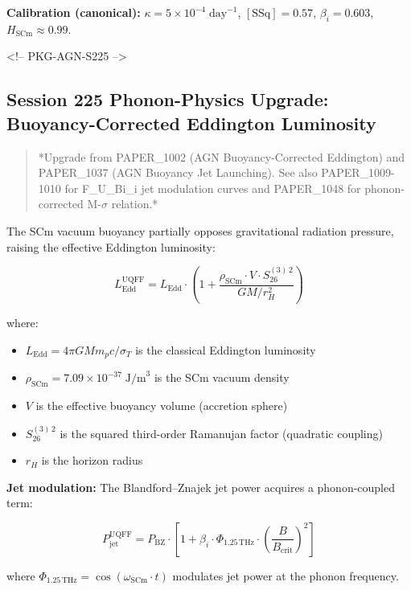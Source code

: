 \documentclass[12pt,a4paper]{article}
\begin{document}
\textbf{Calibration (canonical):} $\kappa = 5 \times 10^{-4}\;\text{day}^{-1}$, $[\text{SSq}] = 0.57$, $\beta_i = 0.603$, $H_{\text{SCm}} \approx 0.99$.

<!-- PKG-AGN-S225 -->

\subsection{Session 225 Phonon-Physics Upgrade: Buoyancy-Corrected Eddington Luminosity}

\begin{quote}
*Upgrade from PAPER\_1002 (AGN Buoyancy-Corrected Eddington) and PAPER\_1037
(AGN Buoyancy Jet Launching).  See also PAPER\_1009-1010 for F\_{U\_Bi\_i} jet
modulation curves and PAPER\_1048 for phonon-corrected M-$\sigma$ relation.*
\end{quote}

The SCm vacuum buoyancy partially opposes gravitational radiation pressure, raising the effective Eddington luminosity:

\begin{equation}
L_{\text{Edd}}^{\text{UQFF}} = L_{\text{Edd}} \cdot \left(1 + \frac{\rho_{\text{SCm}} \cdot V \cdot S_{26}^{(3)\,2}}{G M / r_H^2}\right)
\end{equation}

where:

\begin{itemize}
  \item $L_{\text{Edd}} = 4\pi G M m_p c / \sigma_T$ is the classical Eddington luminosity
  \item $\rho_{\text{SCm}} = 7.09 \times 10^{-37}\;\text{J/m}^3$ is the SCm vacuum density
  \item $V$ is the effective buoyancy volume (accretion sphere)
  \item $S_{26}^{(3)\,2}$ is the squared third-order Ramanujan factor (quadratic coupling)
  \item $r_H$ is the horizon radius
\end{itemize}

\textbf{Jet modulation:} The Blandford--Znajek jet power acquires a phonon-coupled term:

\begin{equation}
P_{\text{jet}}^{\text{UQFF}} = P_{\text{BZ}} \cdot \left[1 + \beta_i \cdot \Phi_{1.25\,\text{THz}} \cdot \left(\frac{B}{B_{\text{crit}}}\right)^2\right]
\end{equation}

where $\Phi_{1.25\,\text{THz}} = \cos(\omega_{\text{SCm}} \cdot t)$ modulates jet power at the phonon frequency.
\end{document}
